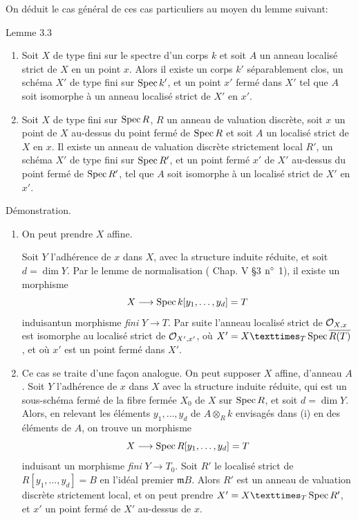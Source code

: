 \documentclass[10pt]{../fichiers-configuration-latex/smfart}
\begin{document}
On déduit le cas général de ces cas particuliers au moyen du lemme
suivant:

\begin{enonce*}{Lemme 3.3}
\begin{enumerate}
\renewcommand{\theenumi}{\roman{enumi}}
\renewcommand{\labelenumi}{(\theenumi)}
\item Soit $X$ de type fini sur le spectre d'un corps $k$ et soit $A$
  un anneau localisé strict de $X$ en un point $x$. Alors il existe un
  corps $k'$ séparablement clos, un schéma $X'$ de type fini sur
  $\operatorname{Spec} k'$, et un point $x'$ fermé dans $X'$ tel que $A$ soit
  isomorphe à un anneau localisé strict de $X'$ en $x'$.

\item Soit $X$ de type fini sur $\operatorname{Spec} R$, $R$ un anneau de valuation
  discrète, soit $x$ un point de $X$ au-dessus du point fermé de
  $\operatorname{Spec} R$ et soit $A$ un localisé strict de $X$ en $x$. Il existe un
  anneau de valuation discrète strictement local $R'$, un schéma $X'$
  de type fini sur $\operatorname{Spec} R'$, et un point fermé $x'$ de $X'$
  au-dessus du point fermé de $\operatorname{Spec} R'$, tel que $A$ soit isomorphe à
  un localisé strict de $X'$ en $x'$.
\end{enumerate}
\end{enonce*}

Démonstration. 
\begin{enumerate}
\renewcommand{\theenumi}{\roman{enumi}}
\renewcommand{\labelenumi}{(\theenumi)}
\item On peut prendre $X$ affine. 

Soit $Y$ l'adhérence de
$x$ dans $X$, avec la structure induite réduite, et soit $d=\dim
Y$. Par le lemme de normalisation (\cite{SGA4-10:2} Chap. V \S 3 ${\rm n^{\circ}}$
1), il existe un morphisme
$$
X\longrightarrow \operatorname{Spec} k[y_1,\dots, y_d]=T
$$
induisant\pageoriginale un morphisme \emph{fini} $Y\rightarrow T$. Par
suite l'anneau localisé strict de ${\mathcal O}_{X,x}$ est isomorphe au localisé
strict de ${\mathcal O}_{X',x'}$, où $X'=\fprod{X}{\Spec\bar{R(T)}}{T}$, et où
$x'$ est un point fermé dans $X'$.

\item Ce cas se traite d'une façon analogue. On peut supposer $X$
  affine, d'anneau $A$. Soit $Y$ l'adhérence de $x$ dans $X$ avec la
  structure induite réduite, qui est un sous-schéma fermé de la fibre
  fermée $X_0$ de $X$ sur $\operatorname{Spec} R$, et soit $d=\dim Y$. Alors, en
  relevant les éléments $y_1,\ldots,y_d$ de $A\otimes_R k$ envisagés
  dans (i) en des éléments de $A$, on trouve un morphisme
$$
X\longrightarrow \operatorname{Spec} R[y_1,\dots,y_d]=T
$$
induisant un morphisme \emph{fini} $Y\rightarrow T_0$. Soit $R'$ le
localisé strict de $R[y_1,\ldots,y_d]=B$ en l'idéal premier
$𝔪B$. %
Alors $R'$ est un anneau de valuation discrète strictement
local, et on peut prendre $X'=\fprod{X}{\Spec R'}{T}$, et $x'$ un
point fermé de $X'$ au-dessus de $x$.
\end{enumerate}
\end{document}
